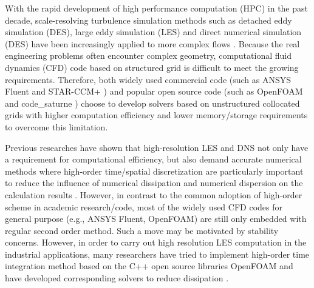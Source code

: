 \documentclass{article}
\begin{document}
With the rapid development of high performance computation (HPC) in the past decade, scale-resolving turbulence simulation methods such as detached eddy simulation (DES), large eddy simulation (LES) and direct numerical simulation (DES) have been increasingly applied to more complex flows \citep{Chain:2015,Sun:2019,Guo:2023:HMT}. Because the real engineering problems often encounter complex geometry, computational fluid dynamics (CFD) code based on structured grid is difficult to meet the growing requirements. Therefore, both widely used commercial code (such as ANSYS Fluent \cite{Fluent} and STAR-CCM+ \citep{STAR}) and popular open source code (such as OpenFOAM \citep{FOAM} and code\_saturne \citep{Saturne}) choose to develop solvers based on unstructured collocated grids with higher computation efficiency and lower memory/storage requirements to overcome this limitation.

Previous researches have shown that high-resolution LES and DNS not only have a requirement for computational efficiency, but also demand accurate numerical methods \citep{Kim:1987,Canuto:2007,Jasak:2007,Vuorinen:2014} where high-order time/spatial discretization are particularly important to reduce the influence of numerical dissipation and numerical dispersion on the calculation results \citep{Kim:1987,Komen:2021,Shu:1988:1,Vuorinen:2012}. However, in contrast to the common adoption of high-order scheme in academic research/code, most of the widely used CFD codes for general purpose (e.g., ANSYS Fluent, OpenFOAM) are still only embedded with regular second order method. Such a move may be motivated by stability concerns. However, in order to carry out high resolution LES computation in the industrial applications, many researchers have tried to implement high-order time integration method based on the C++ open source libraries OpenFOAM and have developed corresponding solvers to reduce dissipation \citep{Vuorinen:2014,Kazemi-Kamyab:2015,Alessandro:2018}.
\end{document}
